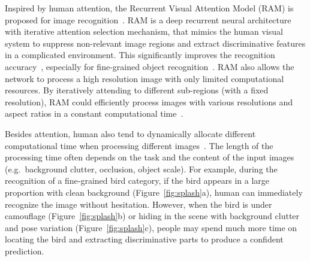 \documentclass[10pt,twocolumn,letterpaper]{article}
\begin{document}
Inspired by human attention, the Recurrent Visual Attention Model (RAM) is proposed for image recognition~\cite{mnih2014recurrent}.
RAM is a deep recurrent neural architecture with iterative attention selection mechanism, that mimics the human visual system to suppress non-relevant image regions and extract discriminative features in a complicated environment.
This significantly improves the recognition accuracy~\cite{ba2014multiple}, especially for fine-grained object recognition~\cite{sermanet2014attention, liu2016localizing}.
RAM also allows the network to process a high resolution image with only limited computational resources.
By iteratively attending to different sub-regions (with a fixed resolution), RAM could efficiently process images with various resolutions and aspect ratios in a constant computational time~\cite{mnih2014recurrent, ba2014multiple}.

Besides attention, human also tend to dynamically allocate different computational time when processing different images~\cite{cichy2014resolving, deco2004neurodynamical}.
The length of the processing time often depends on the task and the content of the input images (e.g.\ background clutter, occlusion, object scale).
For example, during the recognition of a fine-grained bird category, if the bird appears in a large proportion with clean background (Figure~\ref{fig:splash}a), human can immediately recognize the image without hesitation.
However, when the bird is under camouflage (Figure~\ref{fig:splash}b) or hiding in the scene with background clutter and pose variation (Figure~\ref{fig:splash}c), people may spend much more time on locating the bird and extracting discriminative parts to produce a confident prediction.

\end{document}
